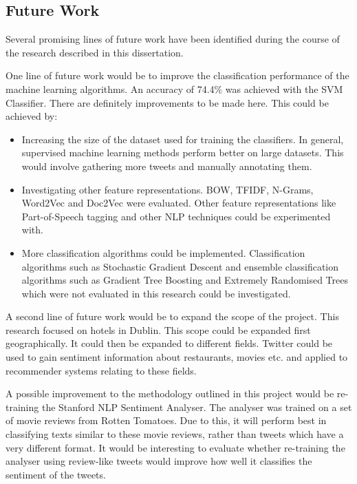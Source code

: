 \subsection{Future Work}

Several promising lines of future work have been identified during the course of the research described in this dissertation.

One line of future work would be to improve the classification performance of the machine learning algorithms. An accuracy of 74.4\% was achieved with the SVM Classifier. There are definitely improvements to be made here. This could be achieved by:
\begin{itemize}
    \item Increasing the size of the dataset used for training the classifiers. In general, supervised machine learning methods perform better on large datasets. This would involve gathering more tweets and manually annotating them.
    \item Investigating other feature representations. BOW, TFIDF, N-Grams, Word2Vec and Doc2Vec were evaluated. Other feature representations like Part-of-Speech tagging and other NLP techniques could be experimented with.
    \item More classification algorithms could be implemented. Classification algorithms such as Stochastic Gradient Descent and ensemble classification algorithms such as Gradient Tree Boosting and Extremely Randomised Trees which were not evaluated in this research could be investigated. 
\end{itemize}

A second line of future work would be to expand the scope of the project. This research focused on hotels in Dublin. This scope could be expanded first geographically. It could then be expanded to different fields. Twitter could be used to gain sentiment information about restaurants, movies etc. and applied to recommender systems relating to these fields.

A possible improvement to the methodology outlined in this project would be re-training the Stanford NLP Sentiment Analyser. The analyser was trained on a set of movie reviews from Rotten Tomatoes. Due to this, it will perform best in classifying texts similar to these movie reviews, rather than tweets which have a very different format. It would be interesting to evaluate whether re-training the analyser using review-like tweets would improve how well it classifies the sentiment of the tweets. 

